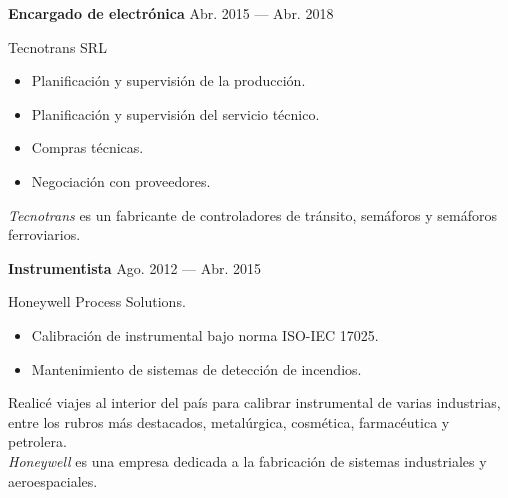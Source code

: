 \bigskip
\parbox[t][][t]{\linewidth}{
	{\parbox{\linewidth}{
		\parbox{\linewidth}{
			\textbf{Encargado de electrónica}
			\hfill
			{Abr. 2015 --- Abr. 2018}
		}
	}}
	\smallbreak
	\parbox{\linewidth}{Tecnotrans SRL}
	\smallbreak
	\begin{itemize}
	    \item{Planificación y supervisión de la producción.}
	    \item{Planificación y supervisión del servicio técnico.}
	    \item{Compras técnicas.}
	    \item{Negociación con proveedores.}
	\end{itemize}
	\smallbreak
	\emph{Tecnotrans} es un fabricante de controladores de tránsito, semáforos y semáforos ferroviarios.
}

\bigskip
\parbox[t][][t]{\linewidth}{
	{\parbox{\linewidth}{
		\parbox{\linewidth}{
			\textbf{Instrumentista}
			\hfill
			{Ago. 2012 --- Abr. 2015}
		}
	}}
	\smallbreak
	\parbox{\linewidth}{Honeywell Process Solutions.}
	\smallbreak
	\begin{itemize}
	    \item{Calibración de instrumental bajo norma ISO-IEC 17025.}
	    \item{Mantenimiento de sistemas de detección de incendios.}
	\end{itemize}
	\smallbreak
	Realicé viajes al interior del país para calibrar instrumental de varias industrias, entre los rubros más destacados, metalúrgica, cosmética, farmacéutica y petrolera.\\
    \emph{Honeywell} es una empresa dedicada a la fabricación de sistemas industriales y aeroespaciales.
}

